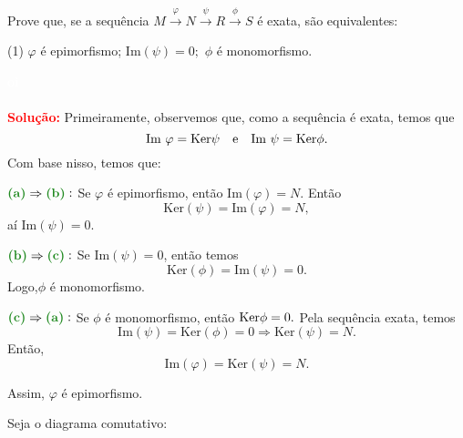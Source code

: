 \documentclass[11pt,a4paper]{article}
\newcounter{exercicio}[section]
\newcommand{\dividiritens}[1]{\begin{tasks}[counter-format={(tsk[a])},label-width=3.6ex, label-format = {\bfseries}, column-sep = {0pt}](1) #1 \end{tasks}}
\newcommand{\pers}[1]{\textcolor{Floresta}{$\negrito{(#1)} $}}
\newcommand{\solucao}[1]{
\textbf{\textcolor{white}{oi}\\ \\ \textcolor{red}{Solução:}} #1}
\begin{document}
 Prove que, se a sequência $M \xrightarrow{\varphi} N \xrightarrow{\psi} R \xrightarrow{\phi} S$ é exata, são equivalentes:
\dividiritens{
\task[\pers{a}] $\varphi$ é epimorfismo;
\task[\pers{b}] $\mbox{Im}(\psi) = 0;$
\task[\pers{c}] $\phi$ é monomorfismo.
}
\solucao{
Primeiramente, observemos que, como a sequência é exata, temos que
\[
\mbox{Im } \varphi = {\rm Ker} \psi \quad \mbox{e} \quad \mbox{Im } \psi = {\rm Ker} \phi.
\]
Com base nisso, temos que:

$\textbf{\textcolor{Floresta}{(a)}} \Rightarrow \textbf{\textcolor{Floresta}{(b)}}:$ Se $\varphi$ é epimorfismo, então $\mbox{Im}(\varphi)=N.$ Então \[\mbox{Ker}(\psi)=\mbox{Im}(\varphi)=N,\] aí $\mbox{Im}(\psi)=0$. 

\medskip
\noindent
$\textbf{\textcolor{Floresta}{(b)}} \Rightarrow \textbf{\textcolor{Floresta}{(c)}}:$
Se $\mbox{Im}(\psi)=0$, então temos \[\mbox{Ker}(\phi)=\mbox{Im}(\psi)=0.\]
Logo,$\phi$ é monomorfismo.

\medskip
\noindent
$\textbf{\textcolor{Floresta}{(c)}} \Rightarrow \textbf{\textcolor{Floresta}{(a)}}:$ Se $\phi$ é monomorfismo, então ${\rm Ker} \phi = 0.$ Pela sequência exata, temos
\[\mbox{Im}(\psi)=\mbox{Ker}(\phi)=0 \Rightarrow \mbox{Ker}(\psi)=N.\]
Então, \[\mbox{Im}(\varphi)=\mbox{Ker}(\psi)=N.\] 

Assim, $\varphi$ é epimorfismo.
}
 Seja o diagrama comutativo:
\begin{center}
\end{center}
\end{document}
